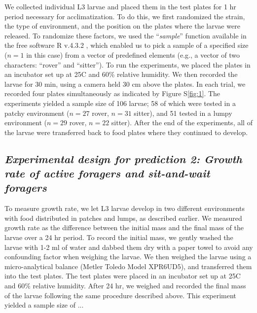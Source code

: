 \documentclass[12pt]{article}
\begin{document}
\vspace{20px}

We collected individual L3 larvae and placed them in the test plates for 1 hr period necessary for acclimatization. To do this, we first randomized the strain, the type of environment, and the position on the plates where the larvae were released. To randomize these factors, we used the ``\textit{sample}'' function available in the free software R v.4.3.2 \citep[2023-10-31,][]{rcore}, which enabled us to pick a sample of a specified size ($n=1$ in this case) from a vector of predefined elements (e.g., a vector of two characters: ``rover'' and ``sitter''). To run the experiments, we placed the plates in an incubator set up at 25\textdegree C and 60\% relative humidity. We then recorded the larvae for 30 min, using a camera held 30 cm above the plates. In each trial, we recorded four plates simultaneously as indicated by Figure S\ref{fig:1}. The experiments yielded a sample size of 106 larvae; 58 of which were tested in a patchy environment ($n=27$ rover, $n=31$ sitter), and 51 tested in a lumpy environment ($n=29$ rover, $n=22$ sitter). After the end of the experiments, all of the larvae were transferred back to food plates where they continued to develop.

\vspace{20px}

\subsection*{\normalsize \textit{Experimental design for prediction 2: Growth rate of active foragers and sit-and-wait foragers}}

To measure growth rate, we let L3 larvae develop in two different environments with food distributed in patches and lumps, as described earlier. We measured growth rate as the difference between the initial mass and the final mass of the larvae over a 24 hr period. To record the initial mass, we gently washed the larvae with 1-2 ml of water and dabbed them dry with a paper towel to avoid any confounding factor when weighing the larvae. We then weighed the larvae using a micro-analytical balance (Metler Toledo Model XPR6UD5), and transferred them into the test plates. The test plates were placed in an incubator set up at 25\textdegree C and 60\% relative humidity. After 24 hr, we weighed and recorded the final mass of the larvae following the same procedure described above. This experiment yielded a sample size of ...
\end{document}
